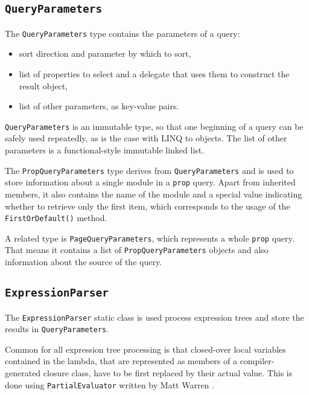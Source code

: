 \subsection{\texorpdfstring{\lstinline{QueryParameters}}{QueryParameters}}

The \lstinline{QueryParameters} type contains the parameters of a query:

\begin{itemize}
\item sort direction and parameter by which to sort,
\item list of properties to select and a delegate that uses them to construct the result object,
\item list of other parameters, as key-value pairs.
\end{itemize}

\lstinline{QueryParameters} is an immutable type,
so that one beginning of a query can be safely used repeatedly, as is the case with LINQ to objects.
The list of other parameters is a functional-style immutable linked list.

\medskip

The \lstinline{PropQueryParameters} type derives from \lstinline{QueryParameters}
and is used to store information about a single module in a \texttt{prop} query.
Apart from inherited members, it also contains the name of the module
and a special value indicating whether to retrieve only the first item,
which corresponds to the usage of the \lstinline{FirstOrDefault()} method.

A related type is \lstinline{PageQueryParameters},
which represents a whole \texttt{prop} query.
That means it contains a list of \lstinline{PropQueryParameters} objects
and also information about the source of the query.

\subsection{\texorpdfstring{\lstinline{ExpressionParser}}{ExpressionParser}}
\label{ltw expressions}

The \lstinline{ExpressionParser} static class is used process expression trees
and store the results in \lstinline{QueryParameters}.

Common for all expression tree processing is that closed-over local variables contained in the lambda,
that are represented as members of a compiler-generated closure class,
have to be first replaced by their actual value.
This is done using \lstinline{PartialEvaluator} written by Matt Warren \cite{warren}.

